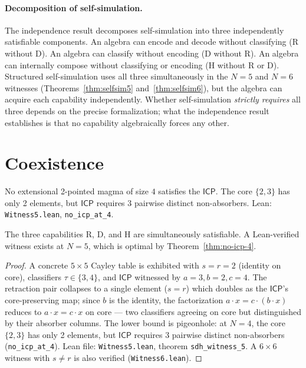\documentclass[sigconf,screen]{acmart}
\newcommand{\ICP}{\textsf{ICP}}
\theoremstyle{remark}
\begin{document}
\paragraph{Decomposition of self-simulation.}
The independence result decomposes self-simulation into three independently satisfiable components. An algebra can encode and decode without classifying (R without D). An algebra can classify without encoding (D without R). An algebra can internally compose without classifying or encoding (H without R or D). Structured self-simulation uses all three simultaneously in the $N\!=\!5$ and $N\!=\!6$ witnesses (Theorems~\ref{thm:selfsim5} and~\ref{thm:selfsim6}), but the algebra can acquire each capability independently. Whether self-simulation \emph{strictly requires} all three depends on the precise formalization; what the independence result establishes is that no capability algebraically forces any other.

\section{Coexistence}
\label{sec:bound}

\begin{theorem}[No ICP at $N\!=\!4$]
\label{thm:no-icp-4}
No extensional 2-pointed magma of size $4$ satisfies the $\ICP$. The core $\{2,3\}$ has only 2 elements, but $\ICP$ requires 3 pairwise distinct non-absorbers. Lean: \texttt{Witness5.lean}, \texttt{no\_icp\_at\_4}.
\end{theorem}

\begin{theorem}
\label{thm:bound}
The three capabilities R, D, and H are simultaneously satisfiable. A Lean-verified witness exists at $N\!=\!5$, which is optimal by Theorem~\ref{thm:no-icp-4}.
\end{theorem}

\begin{proof}
A concrete $5 \times 5$ Cayley table is exhibited with $s\!=\!r\!=\!2$ (identity on core), classifiers $\tau \in \{3,4\}$, and $\ICP$ witnessed by $a\!=\!3, b\!=\!2, c\!=\!4$. The retraction pair collapses to a single element ($s\!=\!r$) which doubles as the $\ICP$'s core-preserving map; since $b$ is the identity, the factorization $a \cdot x = c \cdot (b \cdot x)$ reduces to $a \cdot x = c \cdot x$ on core --- two classifiers agreeing on core but distinguished by their absorber columns. The lower bound is pigeonhole: at $N\!=\!4$, the core $\{2,3\}$ has only 2 elements, but $\ICP$ requires 3 pairwise distinct non-absorbers (\texttt{no\_icp\_at\_4}). Lean file: \texttt{Witness5.lean}, theorem \texttt{sdh\_witness\_5}. A $6 \times 6$ witness with $s \neq r$ is also verified (\texttt{Witness6.lean}).
\end{proof}
\end{document}
